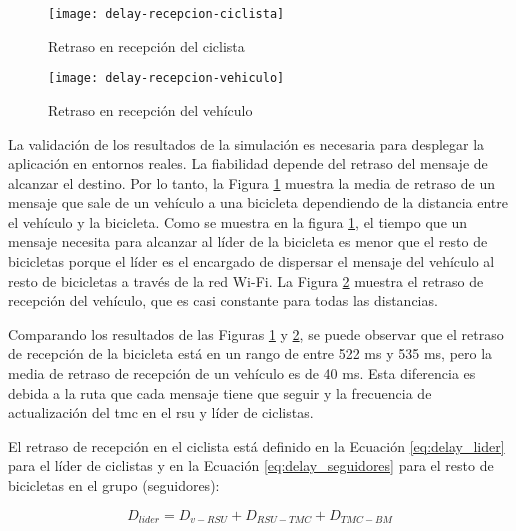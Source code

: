 \begin{figure}[h]
	\texttt{[image: delay-recepcion-ciclista]}
	\caption{Retraso en recepción del ciclista}
	\label{fig:delay-recepcion-ciclista}
\end{figure}

\begin{figure}[h]
	\texttt{[image: delay-recepcion-vehiculo]}
	\caption{Retraso en recepción del vehículo}
	\label{fig:delay-recepcion-vehiculo}
\end{figure}

La validación de los resultados de la simulación es necesaria para desplegar la
aplicación en entornos reales. La fiabilidad depende del retraso del mensaje de
alcanzar el destino. Por lo tanto, la Figura \ref{fig:delay-recepcion-ciclista}
muestra la media de retraso de un mensaje que sale de un vehículo a una
bicicleta dependiendo de la distancia entre el vehículo y la bicicleta. Como
se muestra en la figura \ref{fig:delay-recepcion-ciclista}, el tiempo que un
mensaje necesita para alcanzar al líder de la bicicleta es menor que el resto
de bicicletas porque el líder es el encargado de dispersar el mensaje del
vehículo al resto de bicicletas a través de la red Wi-Fi. La Figura
\ref{fig:delay-recepcion-vehiculo} muestra el retraso de recepción del vehículo,
que es casi constante para todas las distancias.

Comparando los resultados de las Figuras \ref{fig:delay-recepcion-ciclista} y
\ref{fig:delay-recepcion-vehiculo}, se puede observar que el retraso de
recepción de la bicicleta está en un rango de entre 522 ms y 535 ms, pero la
media de retraso de recepción de un vehículo es de 40 ms. Esta diferencia es
debida a la ruta que cada mensaje tiene que seguir y la frecuencia de
actualización del \gls{tmc} en el \gls{rsu} y líder de ciclistas.

El retraso de recepción en el ciclista está definido en la Ecuación
\ref{eq:delay_lider} para el líder de ciclistas y en la Ecuación
\ref{eq:delay_seguidores} para el resto de bicicletas en el grupo (seguidores):

\begin{equation}\label{eq:delay_lider}
D_{lider} = D_{v-RSU} + D_{RSU-TMC} + D_{TMC-BM}
\end{equation}

